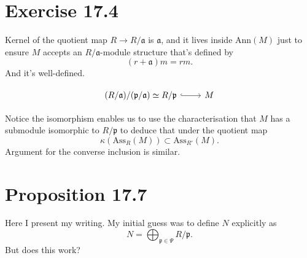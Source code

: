 
\section{Exercise 17.4}

Kernel of the quotient map $R\to R/\mathfrak a$ is $\mathfrak a$, and it lives inside $\text{Ann}(M)$ just to ensure $M$ accepts an $R/\mathfrak a$-module structure that's defined by 
\[(r+\mathfrak a)m=rm.\] And it's well-defined.

\[\begin{tikzcd}
	{(R/\mathfrak a)/(\mathfrak p/\mathfrak a)\simeq R/\mathfrak p} & M
	\arrow[hook, from=1-1, to=1-2]
\end{tikzcd}\]

Notice the isomorphism enables us to use the characterisation that $M$ has a submodule isomorphic to $R/\mathfrak p$ to deduce that under the quotient map \[\kappa(\text{Ass}_R(M))\subset \text{Ass}_{R'}(M).\]
Argument for the converse inclusion is similar.

\section{Proposition 17.7}

Here I present my writing. My initial guess was to define $N$ explicitly as
\[N=\bigoplus_{\mathfrak p\in \Psi}R/\mathfrak p.\]
But does this work? 

